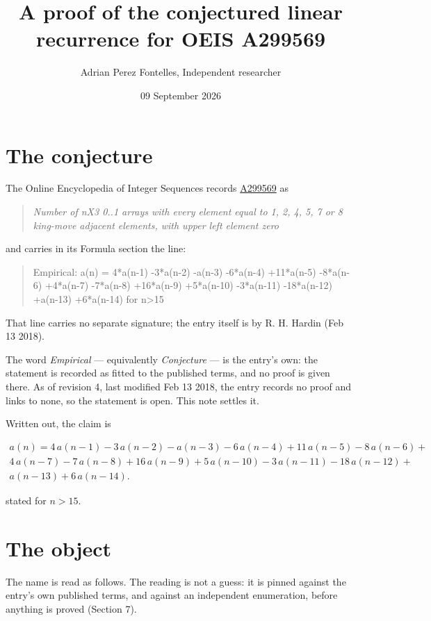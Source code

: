 \documentclass[11pt]{article}
\title{A proof of the conjectured linear recurrence for OEIS A299569}
\author{Adrian Perez Fontelles, Independent researcher}
\date{09 September 2026}
\theoremstyle{definition}
\begin{document}
\maketitle
\section{The conjecture}

The Online Encyclopedia of Integer Sequences records \href{https://oeis.org/A299569}{A299569} as

\begin{quote}\itshape Number of nX3 0..1 arrays with every element equal to 1, 2, 4, 5, 7 or 8 king-move adjacent elements, with upper left element zero\end{quote}

and carries in its Formula section the line:

\begin{quote}\ttfamily Empirical: a(n) = 4*a(n-1) -3*a(n-2) -a(n-3) -6*a(n-4) +11*a(n-5) -8*a(n-6) +4*a(n-7) -7*a(n-8) +16*a(n-9) +5*a(n-10) -3*a(n-11) -18*a(n-12) +a(n-13) +6*a(n-14) for n>15\end{quote}

That line carries no separate signature; the entry itself is by R. H. Hardin (Feb 13 2018).

The word {\itshape Empirical} --- equivalently {\itshape Conjecture} --- is the entry's own: the statement is recorded as fitted to the published terms, and no proof is given there. As of revision 4, last modified Feb 13 2018, the entry records no proof and links to none, so the statement is open. This note settles it.

Written out, the claim is

\begin{multline*} a(n) = 4\,a(n-1) - 3\,a(n-2) - a(n-3) - 6\,a(n-4) + 11\,a(n-5) - 8\,a(n-6) + \\ 4\,a(n-7) - 7\,a(n-8) + 16\,a(n-9) + 5\,a(n-10) - 3\,a(n-11) - 18\,a(n-12) + \\ a(n-13) + 6\,a(n-14). \end{multline*}

stated for $n > 15$.

\section{The object}

The name is read as follows. The reading is not a guess: it is pinned against the entry's own published terms, and against an independent enumeration, before anything is proved (Section 7).
\end{document}
